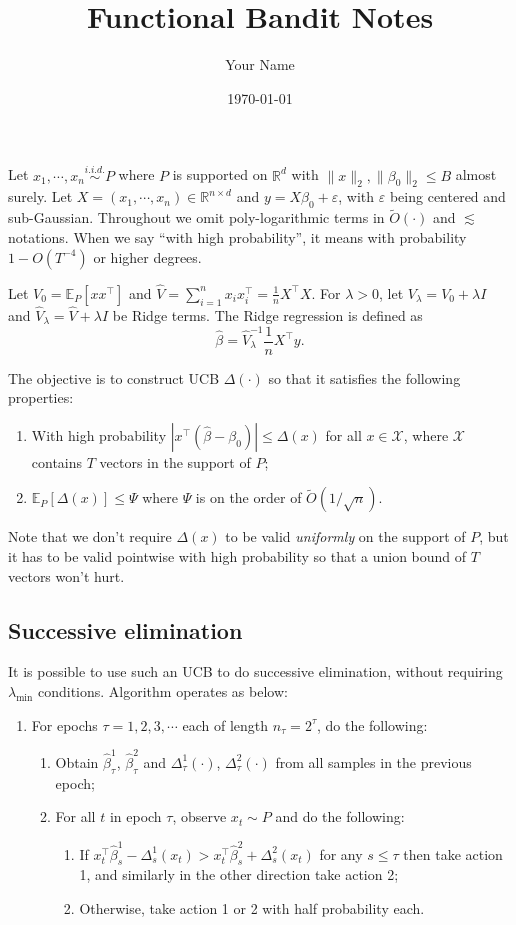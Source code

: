 \documentclass[11pt,a4paper]{article}
\title{Functional Bandit Notes}
\author{Your Name}
\date{\today}
\renewcommand{\hat}{\widehat}
\renewcommand{\tilde}{\widetilde}
\theoremstyle{definition}
\theoremstyle{plain}
\theoremstyle{remark}
\begin{document}
Let $x_1,\cdots,x_n\overset{i.i.d.}{\sim} P$ where $P$ is supported on $\mathbb R^d$ with $\|x\|_2,\|\beta_0\|_2\leq B$ almost surely.
Let $X=(x_1,\cdots,x_n)\in\mathbb R^{n\times d}$ and $y=X\beta_0 + \varepsilon$, with $\varepsilon$ being centered and sub-Gaussian.
Throughout we omit poly-logarithmic terms in $\tilde O(\cdot)$ and $\lesssim$ notations. When we say ``with high probability'', it means with probability $1-O(T^{-4})$ or higher degrees.

Let $V_0 = \mathbb E_P[xx^\top]$ and $\hat V = \sum_{i=1}^n x_ix_i^\top=\frac{1}{n}X^\top X$.  
For $\lambda>0$, let $V_\lambda = V_0+\lambda I$ and $\hat V_\lambda = \hat V+\lambda I$ be Ridge terms. The Ridge regression is defined as
$$
\hat\beta = \hat V_\lambda^{-1}\frac{1}{n}X^\top y.
$$

The objective is to construct UCB $\Delta(\cdot)$ so that it satisfies the following properties:
\begin{enumerate}
\item With high probability $|x^\top(\hat\beta-\beta_0)|\leq\Delta(x)$ for all $x\in\mathcal X$, where $\mathcal X$ contains $T$ vectors in the support of $P$;
\item $\mathbb E_P[\Delta(x)]\leq \Psi$ where $\Psi$ is on the order of $\tilde O(1/\sqrt{n})$.
\end{enumerate}

Note that we don't require $\Delta(x)$ to be valid \emph{uniformly} on the support of $P$, but it has to be valid pointwise with high probability so that a union bound of $T$ vectors won't hurt.

\subsection{Successive elimination}

It is possible to use such an UCB to do successive elimination, without requiring $\lambda_{\min}$ conditions. Algorithm operates as below:
\begin{enumerate}
\item For epochs $\tau=1,2,3,\cdots$ each of length $n_\tau=2^\tau$, do the following:
\begin{enumerate}
\item Obtain $\hat\beta_\tau^1$, $\hat\beta_\tau^2$ and $\Delta_\tau^1(\cdot)$, $\Delta_\tau^2(\cdot)$ from all samples in the previous epoch;
\item For all $t$ in epoch $\tau$, observe $x_t\sim P$ and do the following:
\begin{enumerate}
\item If $x_t^\top\hat\beta_s^1-\Delta_s^1(x_t)>x_t^\top\hat\beta_s^2+\Delta_s^2(x_t)$ for any $s\leq \tau$ then take action 1, and similarly in the other direction take action 2;
\item Otherwise, take action 1 or 2 with half probability each.
\end{enumerate}
\end{enumerate}
\end{enumerate}
\end{document}
